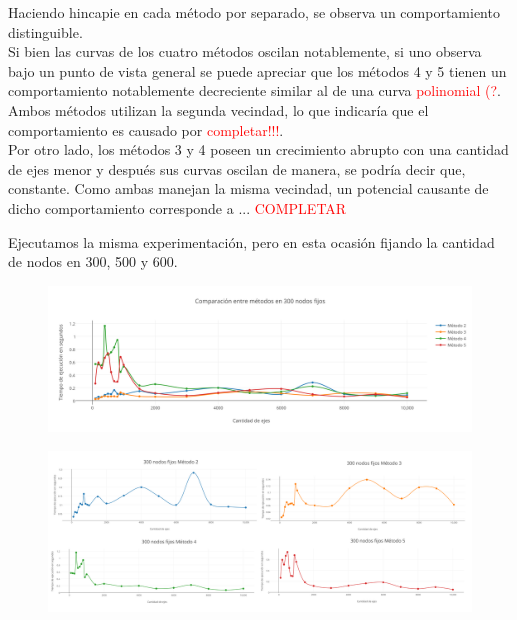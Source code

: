  Haciendo hincapie en cada m\'etodo por separado, se observa un comportamiento distinguible.\\
 
 Si bien las curvas de los cuatro m\'etodos oscilan notablemente, si uno observa bajo un punto de vista general se puede apreciar que los m\'etodos 4 y 5 tienen un comportamiento notablemente decreciente similar al de una curva \textcolor{red}{polinomial (?}. Ambos m\'etodos utilizan la segunda vecindad, lo que indicar\'ia que el comportamiento es causado por \textcolor{red}{completar!!!}.\\
 
 Por otro lado, los m\'etodos 3 y 4 poseen un crecimiento abrupto con una cantidad de ejes menor y despu\'es sus curvas oscilan de manera, se podr\'ia decir que, constante. Como ambas manejan la misma vecindad, un potencial causante de dicho comportamiento corresponde a ... \textcolor{red}{COMPLETAR}\\

\bigskip

Ejecutamos la misma experimentaci\'on, pero en esta ocasi\'on fijando la cantidad de nodos en 300, 500 y 600. 
 
  \begin{figure}[h!]
   \begin{center}
 	\includegraphics[scale=0.55]{imagenes/local/tiempos/300nodos.png}
   \end{center}
 \end{figure}
 
   \begin{figure}[h!]
   \begin{center}
 	\includegraphics[scale=0.08]{imagenes/local/tiempos/300nodos2.png}
   \end{center}
 \end{figure}



